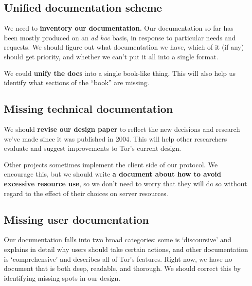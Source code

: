 \documentclass{article}
\begin{document}
\subsection{Unified documentation scheme}

We need to {\bf inventory our documentation.}  Our documentation so far has
been mostly produced on an {\it ad hoc} basis, in response to particular
needs and requests.  We should figure out what documentation we have, which of
it (if any) should get priority, and whether we can't put it all into a
single format.

We could {\bf unify the docs} into a single book-like thing.  This will also
help us identify what sections of the ``book'' are missing.

\subsection{Missing technical documentation}

We should {\bf revise our design paper} to reflect the new decisions and
research we've made since it was published in 2004.  This will help other
researchers evaluate and suggest improvements to Tor's current design.

Other projects sometimes implement the client side of our protocol.  We
encourage this, but we should write {\bf a document about how to avoid
excessive resource use}, so we don't need to worry that they will do so
without regard to the effect of their choices on server resources.

\subsection{Missing user documentation}

Our documentation falls into two broad categories: some is `discoursive' and
explains in detail why users should take certain actions, and other
documentation is `comprehensive' and describes all of Tor's features.  Right
now, we have no document that is both deep, readable, and thorough.  We
should correct this by identifying missing spots in our design.

 
\end{document}
